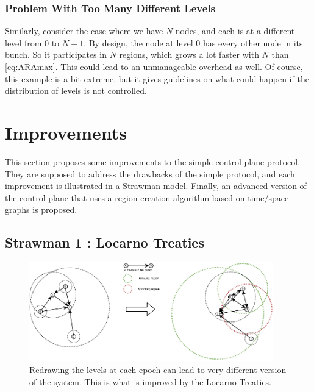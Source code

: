\documentclass[a4paper,11pt,twoside=semi,openright]{report}
\begin{document}
\subsection{Problem With Too Many Different Levels} Similarly, consider the
case where we have $N$ nodes, and each is at a different level from $0$ to
$N-1$. By design, the node at level $0$ has every other node in its bunch. So
it participates in $N$ regions, which grows a lot faster with $N$ than
\autoref{eq:ARAmax}. This could lead to an unmanageable overhead as well. Of
course, this example is a bit extreme, but it gives guidelines on what could
happen if the distribution of levels is not controlled.

\chapter{Improvements} \label{chap:Improvements} %

This section proposes some improvements to the simple control plane protocol.
They are supposed to address the drawbacks of the simple protocol, and each
improvement is illustrated in a Strawman model. Finally, an advanced version of
the control plane that uses a region creation algorithm based on time/space
graphs is proposed. 

\section{Strawman 1 : Locarno Treaties} \label{Locarno}

\begin{figure}[!h] 
\centering
\includegraphics[width=300pt]{figures/LocarnoTreaties-Redrawing}
\caption{Redrawing the levels at each epoch can lead to very different version
    of the system. This is what is improved by the Locarno Treaties.}
    \label{fig:LocarnoTreaties-Redrawing}
\end{figure}
\end{document}
